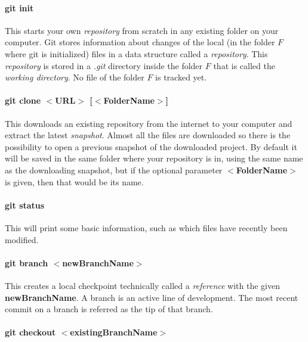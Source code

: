 \documentclass[a4paper, 12pt]{article}
\begin{document}
\paragraph{git init}
This starts your own \emph{repository} from scratch in any existing folder on your computer. Git stores information about changes of the local (in the folder $F$ where git is initialized) files in a data structure called a \emph{repository}. This \emph{repository} is stored in a \emph{.git} directory inside the folder $F$ that is called the \emph{working directory}. No file of the folder $F$ is tracked yet.

\paragraph{git clone $<$URL$>$ [$<$FolderName$>$]}
This downloads an existing repository from the internet to your computer and extract the latest \emph{snapshot}. Almost all the files are downloaded so there is the possibility to open a previous snapshot of the downloaded project. By default it will be saved in the same folder where your repository is in, using the same name as the downloading snapshot, but if the optional parameter \textbf{$<$FolderName$>$} is given, then that would be its name.

\paragraph{git status}
This will print some basic information, such as which files have recently been modified.

\paragraph{git branch $<$newBranchName$>$}
This creates a local checkpoint technically called a \emph{reference} with the given \textbf{newBranchName}. A branch is an active line of development. The most recent commit on a branch is referred as the tip of that branch.

\paragraph{git checkout $<$existingBranchName$>$}
\end{document}
